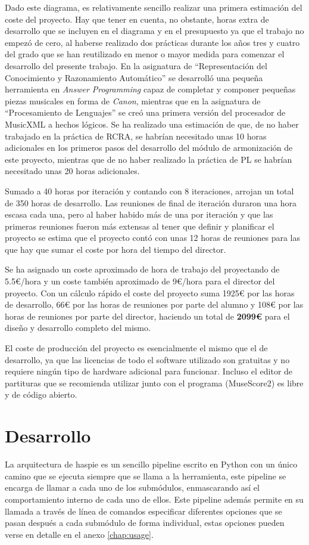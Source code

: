 Dado este diagrama, es relativamente sencillo realizar una primera estimación del coste del proyecto. Hay que tener en cuenta, no obstante, horas extra de desarrollo que se incluyen en el diagrama y en el presupuesto ya que el trabajo no empezó de cero, al haberse realizado dos prácticas durante los años tres y cuatro del grado que se han reutilizado en menor o mayor medida para comenzar el desarrollo del presente trabajo. En la asignatura de ``Representación del Conocimiento y Razonamiento Automático'' se desarrolló una pequeña herramienta en \textit{Answer Programming} capaz de completar y componer pequeñas piezas musicales en forma de \textit{Canon}, mientras que en la asignatura de ``Procesamiento de Lenguajes'' se creó una primera versión del procesador de MusicXML a hechos lógicos. Se ha realizado una estimación de que, de no haber trabajado en la práctica de RCRA, se habrían necesitado unas 10 horas adicionales en los primeros pasos del desarrollo del módulo de armonización de este proyecto, mientras que de no haber realizado la práctica de PL se habrían necesitado unas 20 horas adicionales.

Sumado a 40 horas por iteración y contando con 8 iteraciones, arrojan un total de 350 horas de desarrollo. Las reuniones de final de iteración duraron una hora escasa cada una, pero al haber habido más de una por iteración y que las primeras reuniones fueron más extensas al tener que definir y planificar el proyecto se estima que el proyecto contó con unas 12 horas de reuniones para las que hay que sumar el coste por hora del tiempo del director.

Se ha asignado un coste aproximado de hora de trabajo del proyectando de 5.5\euro{}/hora y un coste también aproximado de 9\euro{}/hora para el director del proyecto. Con un cálculo rápido el coste del proyecto suma 1925\euro{} por las horas de desarrollo, 66\euro{} por las horas de reuniones por parte del alumno y 108\euro{} por las horas de reuniones por parte del director, haciendo un total de \textbf{2099\euro{}} para el diseño y desarrollo completo del mismo.

El coste de producción del proyecto es esencialmente el mismo que el de desarrollo, ya que las licencias de todo el software utilizado son gratuitas y no requiere ningún tipo de hardware adicional para funcionar. Incluso el editor de partituras que se recomienda utilizar junto con el programa (MuseScore2) es libre y de código abierto.

\section{Desarrollo}
\label{sec:development}
La arquitectura de haspie es un sencillo pipeline escrito en Python con un único camino que se ejecuta siempre que se llama a la herramienta, este pipeline se encarga de llamar a cada uno de los submódulos, enmascarando así el comportamiento interno de cada uno de ellos. Este pipeline además permite en su llamada a través de línea de comandos especificar diferentes opciones que se pasan después a cada submódulo de forma individual, estas opciones pueden verse en detalle en el anexo \ref{chap:usage}.

